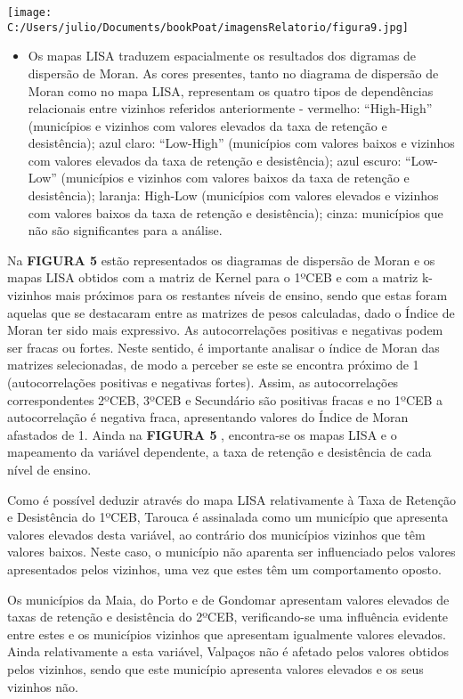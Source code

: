 \documentclass[
]{book}
\providecommand{\tightlist}{%
  \setlength{\itemsep}{0pt}\setlength{\parskip}{0pt}}
\begin{document}
\texttt{[image: C:/Users/julio/Documents/bookPoat/imagensRelatorio/figura9.jpg]}

\begin{itemize}
\tightlist
\item
  Os mapas LISA traduzem espacialmente os resultados dos digramas de dispersão de Moran. As cores presentes, tanto no diagrama de dispersão de Moran como no mapa LISA, representam os quatro tipos de dependências relacionais entre vizinhos referidos anteriormente - vermelho: ``High-High'' (municípios e vizinhos com valores elevados da taxa de retenção e desistência); azul claro: ``Low-High'' (municípios com valores baixos e vizinhos com valores elevados da taxa de retenção e desistência); azul escuro: ``Low-Low'' (municípios e vizinhos com valores baixos da taxa de retenção e desistência); laranja: High-Low (municípios com valores elevados e vizinhos com valores baixos da taxa de retenção e desistência); cinza: municípios que não são significantes para a análise.
\end{itemize}

Na \textbf{FIGURA 5} estão representados os diagramas de dispersão de Moran e os mapas LISA obtidos com a matriz de Kernel para o 1ºCEB e com a matriz k-vizinhos mais próximos para os restantes níveis de ensino, sendo que estas foram aquelas que se destacaram entre as matrizes de pesos calculadas, dado o Índice de Moran ter sido mais expressivo. As autocorrelações positivas e negativas podem ser fracas ou fortes. Neste sentido, é importante analisar o índice de Moran das matrizes selecionadas, de modo a perceber se este se encontra próximo de 1 (autocorrelações positivas e negativas fortes). Assim, as autocorrelações correspondentes 2ºCEB, 3ºCEB e Secundário são positivas fracas e no 1ºCEB a autocorrelação é negativa fraca, apresentando valores do Índice de Moran afastados de 1. Ainda na \textbf{FIGURA 5} , encontra-se os mapas LISA e o mapeamento da variável dependente, a taxa de retenção e desistência de cada nível de ensino.

Como é possível deduzir através do mapa LISA relativamente à Taxa de Retenção e Desistência do 1ºCEB, Tarouca é assinalada como um município que apresenta valores elevados desta variável, ao contrário dos municípios vizinhos que têm valores baixos. Neste caso, o município não aparenta ser influenciado pelos valores apresentados pelos vizinhos, uma vez que estes têm um comportamento oposto.

Os municípios da Maia, do Porto e de Gondomar apresentam valores elevados de taxas de retenção e desistência do 2ºCEB, verificando-se uma influência evidente entre estes e os municípios vizinhos que apresentam igualmente valores elevados. Ainda relativamente a esta variável, Valpaços não é afetado pelos valores obtidos pelos vizinhos, sendo que este município apresenta valores elevados e os seus vizinhos não.
\end{document}

